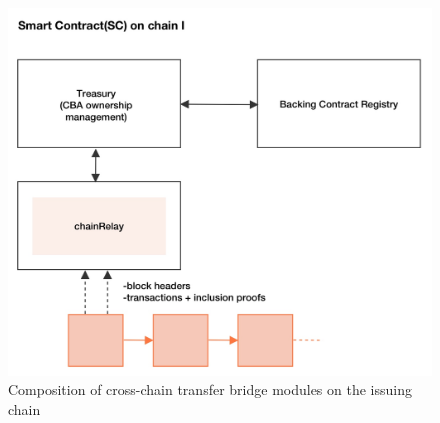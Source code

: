 \subsection*{}

\begin{figure}
\centering
\includegraphics[scale=0.2]{pic/Smart Contract(SC) on chain I.jpg}
\caption{Composition of cross-chain transfer bridge modules on the issuing chain}
\label{fig:picture001}
\end{figure}

\newpage